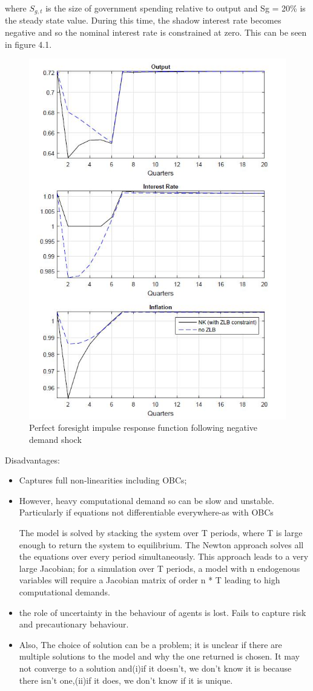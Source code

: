 \documentclass[10pt,math=newtx,citestyle=gb7714-2015,bibstyle=gb7714-2015]{elegantbook}
\begin{document}
{where $S_{g,t}$ is the size of government spending relative to output and Sg = 20\% is the steady state value. During this time, the shadow interest rate becomes negative and so the nominal interest rate is constrained at zero. This can be
seen in figure 4.1.

\begin{figure}[htbp!]
	\centering
	\includegraphics[width=0.8\linewidth]{FIG/simul}
	\caption{Perfect foresight impulse response function following negative demand shock}\label{4.1}
	\centering
\end{figure}

Disadvantages:

\begin{itemize}
	\item Captures full non-linearities including OBCs;
	\item However, heavy computational demand so can be slow and unstable. Particularly if equations not differentiable everywhere-as with OBCs
	
	The model is solved by stacking the system over T periods, where T is large enough to return the system to equilibrium. The Newton approach solves all the equations over every period simultaneously. This approach leads to a very large Jacobian; for a simulation over T periods, a model with n endogenous variables will require a Jacobian matrix of order n * T leading to high computational demands.
	\item the role of uncertainty in the behaviour of agents is lost. Fails to capture risk and precautionary behaviour.
	\item Also, The choice of solution can be a problem; it is unclear if there are multiple solutions to the model and why the one returned is chosen. It may not converge to a solution and(i)if it doesn't, we don't know it is because there isn't one,(ii)if it does, we don't know if it is unique.
	

\end{itemize}}
\end{document}
